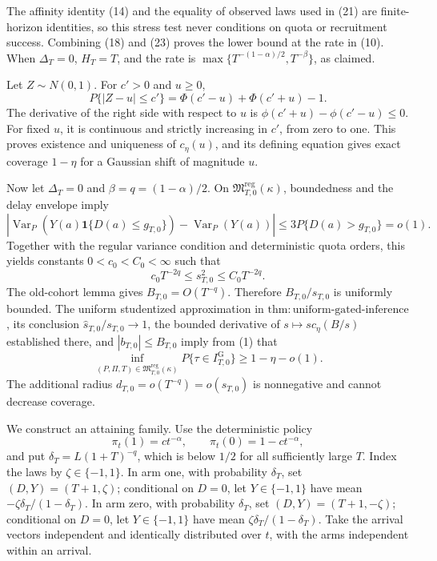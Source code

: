 The affinity identity (14) and the equality of observed laws used in (21) are finite-horizon identities, so this stress test never conditions on quota or recruitment success.  Combining (18) and (23) proves the lower bound at the rate in (10).  When \(\Delta_T=0\), \(H_T=T\), and the rate is \(\max\{T^{-(1-\alpha)/2},T^{-\beta}\}\), as claimed.

Let \(Z\sim N(0,1)\).  For \(c'>0\) and \(u\geq0\),
\[
 P\{|Z-u|\leq c'\}=\Phi(c'-u)+\Phi(c'+u)-1. \tag{1}
\]
The derivative of the right side with respect to \(u\) is \(\phi(c'+u)-\phi(c'-u)\leq0\).  For fixed \(u\), it is continuous and strictly increasing in \(c'\), from zero to one.  This proves existence and uniqueness of \(c_\eta(u)\), and its defining equation gives exact coverage \(1-\eta\) for a Gaussian shift of magnitude \(u\).

Now let \(\Delta_T=0\) and \(\beta=q=(1-\alpha)/2\).  On \(\mathfrak M_{T,0}^{\mathrm{reg}}(\kappa)\), boundedness and the delay envelope imply
\[
 |\operatorname{Var}_P(Y(a)\mathbf 1\{D(a)\leq g_{T,0}\})
 -\operatorname{Var}_P(Y(a))|
 \leq3P\{D(a)>g_{T,0}\}=o(1). \tag{2}
\]
Together with the regular variance condition and deterministic quota orders, this yields constants \(0<c_0<C_0<\infty\) such that
\[
 c_0T^{-2q}\leq s_{T,0}^2\leq C_0T^{-2q}. \tag{3}
\]
The old-cohort lemma gives \(B_{T,0}=O(T^{-q})\).  Therefore \(B_{T,0}/s_{T,0}\) is uniformly bounded.  The uniform studentized approximation in \(\mathrm{thm:uniform\text{-}gated\text{-}inference}\), its conclusion \(\widehat s_{T,0}/s_{T,0}\to1\), the bounded derivative of \(s\mapsto s c_\eta(B/s)\) established there, and \(|b_{T,0}|\leq B_{T,0}\) imply from (1) that
\[
 \inf_{(P,\Pi,T)\in\mathfrak M_{T,0}^{\mathrm{reg}}(\kappa)}
 P\{\tau\in I_{T,0}^{\mathrm G}\}\geq1-\eta-o(1). \tag{4}
\]
The additional radius \(d_{T,0}=o(T^{-q})=o(s_{T,0})\) is nonnegative and cannot decrease coverage.

We construct an attaining family.  Use the deterministic policy
\[
 \pi_t(1)=ct^{-\alpha},\qquad \pi_t(0)=1-ct^{-\alpha}, \tag{5}
\]
and put \(\delta_T=L(1+T)^{-q}\), which is below \(1/2\) for all sufficiently large \(T\).  Index the laws by \(\zeta\in\{-1,1\}\).  In arm one, with probability \(\delta_T\), set \((D,Y)=(T+1,\zeta)\); conditional on \(D=0\), let \(Y\in\{-1,1\}\) have mean \(-\zeta\delta_T/(1-\delta_T)\).  In arm zero, with probability \(\delta_T\), set \((D,Y)=(T+1,-\zeta)\); conditional on \(D=0\), let \(Y\in\{-1,1\}\) have mean \(\zeta\delta_T/(1-\delta_T)\).  Take the arrival vectors independent and identically distributed over \(t\), with the arms independent within an arrival.

